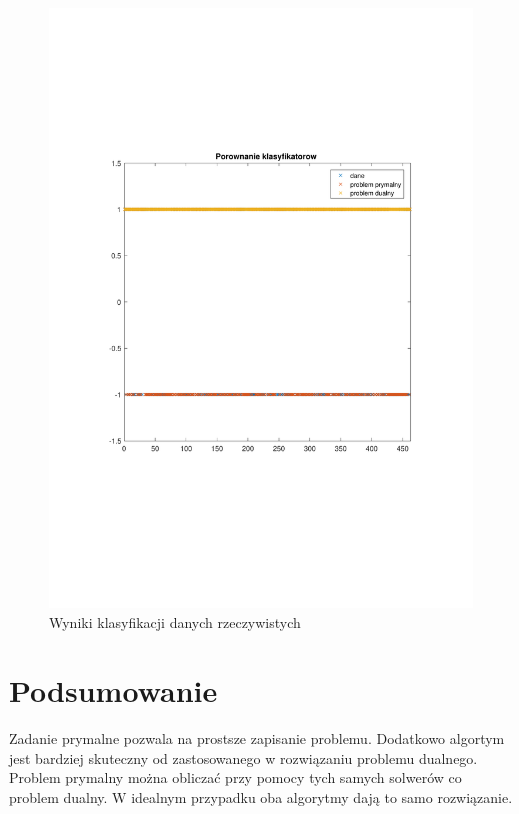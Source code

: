 \documentclass[]{article}
\begin{document}
\begin{figure}[H]
	\centering
	\includegraphics[width=0.9\linewidth]{dane_rzeczywiste}
	\caption{Wyniki klasyfikacji danych rzeczywistych}
	\label{fig:daleko}
\end{figure}

\section{Podsumowanie}
Zadanie prymalne pozwala na prostsze zapisanie problemu. Dodatkowo algortym jest bardziej skuteczny od zastosowanego w rozwiązaniu problemu dualnego. Problem prymalny można obliczać przy pomocy tych samych solwerów co problem dualny. W idealnym przypadku oba algorytmy dają to samo rozwiązanie.
\end{document}

